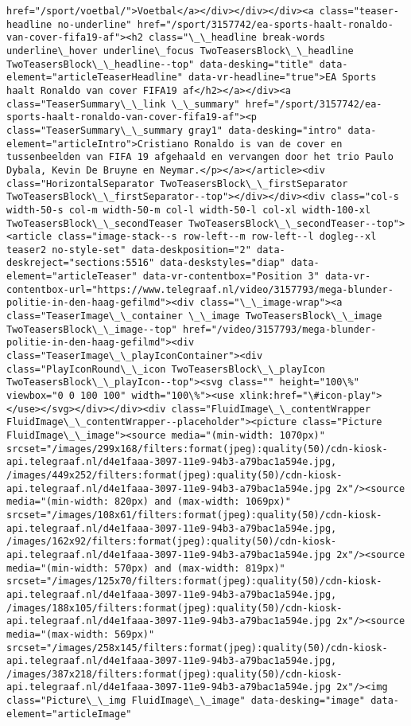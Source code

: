 \documentclass[11pt]{article}
\begin{document}
\begin{Verbatim}[commandchars=\\\{\}]
href="/sport/voetbal/">Voetbal</a></div></div></div><a class="teaser-headline no-underline" href="/sport/3157742/ea-sports-haalt-ronaldo-van-cover-fifa19-af"><h2 class="\_\_headline break-words underline\_hover underline\_focus TwoTeasersBlock\_\_headline TwoTeasersBlock\_\_headline--top" data-desking="title" data-element="articleTeaserHeadline" data-vr-headline="true">EA Sports haalt Ronaldo van cover FIFA19 af</h2></a></div><a class="TeaserSummary\_\_link \_\_summary" href="/sport/3157742/ea-sports-haalt-ronaldo-van-cover-fifa19-af"><p class="TeaserSummary\_\_summary gray1" data-desking="intro" data-element="articleIntro">Cristiano Ronaldo is van de cover en tussenbeelden van FIFA 19 afgehaald en vervangen door het trio Paulo Dybala, Kevin De Bruyne en Neymar.</p></a></article><div class="HorizontalSeparator TwoTeasersBlock\_\_firstSeparator TwoTeasersBlock\_\_firstSeparator--top"></div></div><div class="col-s width-50-s col-m width-50-m col-l width-50-l col-xl width-100-xl TwoTeasersBlock\_\_secondTeaser TwoTeasersBlock\_\_secondTeaser--top"><article class="image-stack--s row-left--m row-left--l dogleg--xl teaser2 no-style-set" data-deskposition="2" data-deskreject="sections:5516" data-deskstyles="diap" data-element="articleTeaser" data-vr-contentbox="Position 3" data-vr-contentbox-url="https://www.telegraaf.nl/video/3157793/mega-blunder-politie-in-den-haag-gefilmd"><div class="\_\_image-wrap"><a class="TeaserImage\_\_container \_\_image TwoTeasersBlock\_\_image TwoTeasersBlock\_\_image--top" href="/video/3157793/mega-blunder-politie-in-den-haag-gefilmd"><div class="TeaserImage\_\_playIconContainer"><div class="PlayIconRound\_\_icon TwoTeasersBlock\_\_playIcon TwoTeasersBlock\_\_playIcon--top"><svg class="" height="100\%" viewbox="0 0 100 100" width="100\%"><use xlink:href="\#icon-play"></use></svg></div></div><div class="FluidImage\_\_contentWrapper FluidImage\_\_contentWrapper--placeholder"><picture class="Picture FluidImage\_\_image"><source media="(min-width: 1070px)" srcset="/images/299x168/filters:format(jpeg):quality(50)/cdn-kiosk-api.telegraaf.nl/d4e1faaa-3097-11e9-94b3-a79bac1a594e.jpg, /images/449x252/filters:format(jpeg):quality(50)/cdn-kiosk-api.telegraaf.nl/d4e1faaa-3097-11e9-94b3-a79bac1a594e.jpg 2x"/><source media="(min-width: 820px) and (max-width: 1069px)" srcset="/images/108x61/filters:format(jpeg):quality(50)/cdn-kiosk-api.telegraaf.nl/d4e1faaa-3097-11e9-94b3-a79bac1a594e.jpg, /images/162x92/filters:format(jpeg):quality(50)/cdn-kiosk-api.telegraaf.nl/d4e1faaa-3097-11e9-94b3-a79bac1a594e.jpg 2x"/><source media="(min-width: 570px) and (max-width: 819px)" srcset="/images/125x70/filters:format(jpeg):quality(50)/cdn-kiosk-api.telegraaf.nl/d4e1faaa-3097-11e9-94b3-a79bac1a594e.jpg, /images/188x105/filters:format(jpeg):quality(50)/cdn-kiosk-api.telegraaf.nl/d4e1faaa-3097-11e9-94b3-a79bac1a594e.jpg 2x"/><source media="(max-width: 569px)" srcset="/images/258x145/filters:format(jpeg):quality(50)/cdn-kiosk-api.telegraaf.nl/d4e1faaa-3097-11e9-94b3-a79bac1a594e.jpg, /images/387x218/filters:format(jpeg):quality(50)/cdn-kiosk-api.telegraaf.nl/d4e1faaa-3097-11e9-94b3-a79bac1a594e.jpg 2x"/><img class="Picture\_\_img FluidImage\_\_image" data-desking="image" data-element="articleImage" 
\end{Verbatim}
\end{document}
